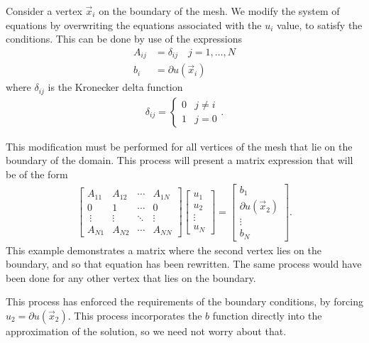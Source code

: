 \documentclass[../fem.tex]{subfile}
\begin{document}
Consider a vertex $\vec{x}_i$ on the boundary of the mesh.  We modify the
system of equations by overwriting the equations associated with the $u_i$
value, to satisfy the conditions. This can be done by use of the expressions
\begin{align*}
  A_{ij}&=\delta_{ij}\quad j=1,\ldots,N\\
  b_i&=\partial u(\vec{x}_i)
\end{align*}
where $\delta_{ij}$ is the Kronecker delta function
\begin{align*}
  \delta_{ij}=
  \begin{cases}
    0 & j\neq i\\
    1 & j= 0
  \end{cases}.
\end{align*}

This modification must be performed for all vertices of the mesh that lie on
the boundary of the domain. This process will present a matrix expression that
will be of
the form
\begin{align*}
   \begin{bmatrix}
     A_{11} & A_{12} & \cdots & A_{1N}\\
     0 & 1 & \cdots & 0\\\
     \vdots & \vdots & \ddots & \vdots\\
     A_{N1} & A_{N2} & \cdots & A_{NN}
   \end{bmatrix}
   \begin{bmatrix}
      u_1\\u_2\\\vdots\\u_N
   \end{bmatrix}=
   \begin{bmatrix}
     b_1\\\partial u(\vec{x}_2)\\\vdots\\b_N
   \end{bmatrix}.
\end{align*}
This example demonstrates a matrix where the second vertex lies on the
boundary, and so that equation has been rewritten. The same process would have
been done for any other vertex that lies on the boundary.

This process has enforced the requirements of the boundary conditions, by
forcing $u_2=\partial u(\vec{x}_2)$. This process incorporates the $b$ function
directly into the approximation of the solution, so we need not worry about
that.
\end{document}
